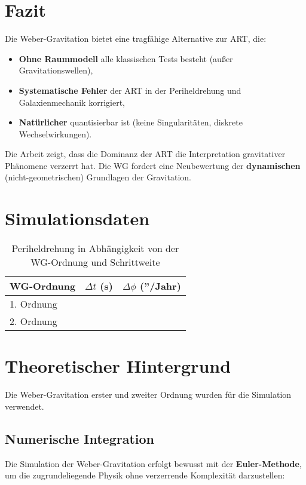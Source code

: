 \section{Fazit}
Die Weber-Gravitation bietet eine tragfähige Alternative zur ART, die:
\begin{itemize}
    \item \textbf{Ohne Raummodell} alle klassischen Tests besteht (außer Gravitationswellen),
    \item \textbf{Systematische Fehler} der ART in der Periheldrehung und Galaxienmechanik korrigiert,
    \item \textbf{Natürlicher} quantisierbar ist (keine Singularitäten, diskrete Wechselwirkungen).
\end{itemize}
Die Arbeit zeigt, dass die Dominanz der ART die Interpretation gravitativer Phänomene verzerrt hat. Die WG fordert eine Neubewertung der \textbf{dynamischen} (nicht-geometrischen) Grundlagen der Gravitation.

\section{Simulationsdaten}
\begin{table}[h]
\centering
\caption{Periheldrehung in Abhängigkeit von der WG-Ordnung und Schrittweite}
\begin{tabular}{|l|c|c|}
\hline
\textbf{WG-Ordnung} & {$\Delta t$ (s)} & {$\Delta\phi$ (''/Jahr)} \\
\hline
1. Ordnung         &                  &                           \\
2. Ordnung         &                  &                           \\
\hline
\end{tabular}
\label{tab:results}
\end{table}

\section{Theoretischer Hintergrund}
Die Weber-Gravitation erster und zweiter Ordnung wurden für die Simulation verwendet.

\subsection{Numerische Integration}
Die Simulation der Weber-Gravitation erfolgt bewusst mit der \textbf{Euler-Methode}, um die zugrundeliegende Physik ohne verzerrende Komplexität darzustellen:

